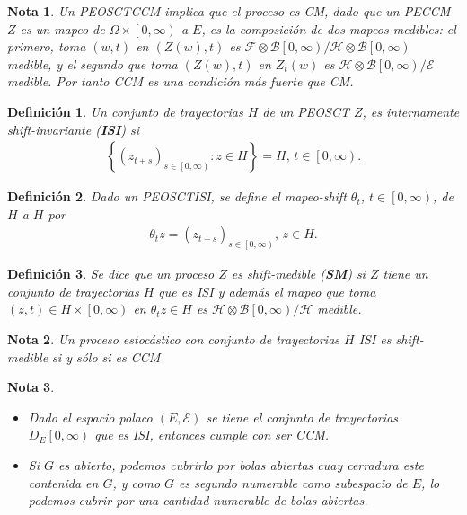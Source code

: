 \documentclass{article}
\newtheorem{Def}{Definición}[section]
\newtheorem{Note}{Nota}%
\numberwithin{equation}{section}
\begin{document}
\begin{Note}
Un PEOSCTCCM implica que el proceso es CM, dado que un PECCM $Z$ es un mapeo de $\Omega\times\left[0,\infty\right)$ a $E$, es la composici\'on de dos mapeos medibles: el primero, toma $\left(w,t\right)$ en $\left(Z\left(w\right),t\right)$ es $\mathcal{F}\otimes\mathcal{B}\left[0,\infty\right)/\mathcal{H}\otimes\mathcal{B}\left[0,\infty\right)$ medible, y el segundo que toma $\left(Z\left(w\right),t\right)$  en $Z_{t}\left(w\right)$ es $\mathcal{H}\otimes\mathcal{B}\left[0,\infty\right)/\mathcal{E}$ medible. Por tanto CCM es una condici\'on m\'as fuerte que CM.
\end{Note}

\begin{Def}
Un conjunto de trayectorias $H$ de un PEOSCT $Z$, es internamente shift-invariante (\textbf{ISI}) si 
\begin{eqnarray}
\left\{\left(z_{t+s}\right)_{s\in\left[0,\infty\right)}:z\in H\right\}=H\textrm{, }t\in\left[0,\infty\right).
\end{eqnarray}
\end{Def}


\begin{Def}
Dado un PEOSCTISI, se define el mapeo-shift $\theta_{t}$, $t\in\left[0,\infty\right)$, de $H$ a $H$ por 
\begin{eqnarray}
\theta_{t}z=\left(z_{t+s}\right)_{s\in\left[0,\infty\right)}\textrm{, }z\in H.
\end{eqnarray}
\end{Def}

\begin{Def}
Se dice que un proceso $Z$ es shift-medible (\textbf{SM}) si $Z$ tiene un conjunto de trayectorias $H$ que es ISI y adem\'as el mapeo que toma $\left(z,t\right)\in H\times\left[0,\infty\right)$ en $\theta_{t}z\in H$ es $\mathcal{H}\otimes\mathcal{B}\left[0,\infty\right)/\mathcal{H}$ medible.
\end{Def}

\begin{Note}
Un proceso estoc\'astico con conjunto de trayectorias $H$ ISI es shift-medible si y s\'olo si es CCM
\end{Note}

\begin{Note}
\begin{itemize}
\item Dado el espacio polaco $\left(E,\mathcal{E}\right)$ se tiene el  conjunto de trayectorias $D_{E}\left[0,\infty\right)$ que es ISI, entonces cumple con ser CCM.

\item Si $G$ es abierto, podemos cubrirlo por bolas abiertas cuay cerradura este contenida en $G$, y como $G$ es segundo numerable como subespacio de $E$, lo podemos cubrir por una cantidad numerable de bolas abiertas.

\end{itemize}
\end{Note}
\end{document}
